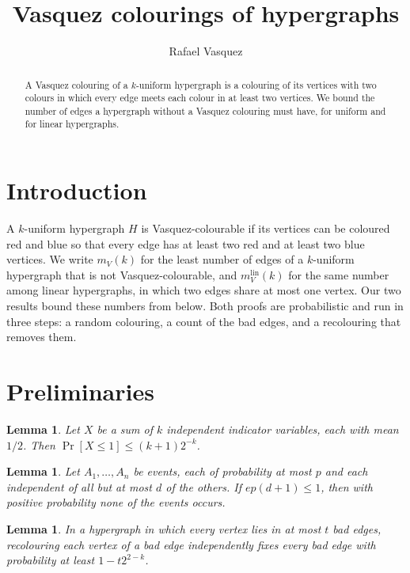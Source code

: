 \documentclass[11pt]{amsart}
\newtheorem{lem}[thm]{Lemma}
\begin{document}
\title{Vasquez colourings of hypergraphs}
\author{Rafael Vasquez}

\begin{abstract}
A Vasquez colouring of a $k$-uniform hypergraph is a colouring of its vertices with two colours in which every edge meets each colour in at least two vertices. We bound the number of edges a hypergraph without a Vasquez colouring must have, for uniform and for linear hypergraphs.
\end{abstract}

\maketitle

\section{Introduction}

A $k$-uniform hypergraph $H$ is Vasquez-colourable if its vertices can be coloured red and blue so that every edge has at least two red and at least two blue vertices. We write $m_V(k)$ for the least number of edges of a $k$-uniform hypergraph that is not Vasquez-colourable, and $m_V^{\mathrm{lin}}(k)$ for the same number among linear hypergraphs, in which two edges share at most one vertex. Our two results bound these numbers from below. Both proofs are probabilistic and run in three steps: a random colouring, a count of the bad edges, and a recolouring that removes them.

\section{Preliminaries}

\begin{lem}\label{lem:chernoff}
Let $X$ be a sum of $k$ independent indicator variables, each with mean $1/2$. Then $\Pr[X \leq 1] \leq (k+1) 2^{-k}$.
\end{lem}

\begin{lem}\label{lem:local}
Let $A_1, \dots, A_n$ be events, each of probability at most $p$ and each independent of all but at most $d$ of the others. If $e p (d+1) \leq 1$, then with positive probability none of the events occurs.
\end{lem}

\begin{lem}\label{lem:recolour}
In a hypergraph in which every vertex lies in at most $t$ bad edges, recolouring each vertex of a bad edge independently fixes every bad edge with probability at least $1 - t 2^{2-k}$.
\end{lem}
\end{document}
